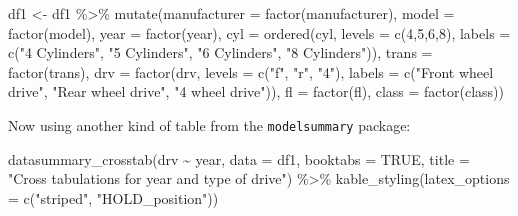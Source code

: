\documentclass[
  11pt,
  a4paper,
  twoside]{scrbook}
\newenvironment{Shaded}{\begin{snugshade}}{\end{snugshade}}
\newcommand{\AttributeTok}[1]{\textcolor[rgb]{0.77,0.63,0.00}{#1}}
\newcommand{\ConstantTok}[1]{\textcolor[rgb]{0.00,0.00,0.00}{#1}}
\newcommand{\DecValTok}[1]{\textcolor[rgb]{0.00,0.00,0.81}{#1}}
\newcommand{\FunctionTok}[1]{\textcolor[rgb]{0.00,0.00,0.00}{#1}}
\newcommand{\NormalTok}[1]{#1}
\newcommand{\OtherTok}[1]{\textcolor[rgb]{0.56,0.35,0.01}{#1}}
\newcommand{\SpecialCharTok}[1]{\textcolor[rgb]{0.00,0.00,0.00}{#1}}
\newcommand{\StringTok}[1]{\textcolor[rgb]{0.31,0.60,0.02}{#1}}
\begin{document}
\begin{Shaded}
\begin{Highlighting}[]
\NormalTok{df1 }\OtherTok{\textless{}{-}}\NormalTok{ df1 }\SpecialCharTok{\%\textgreater{}\%} 
    \FunctionTok{mutate}\NormalTok{(}\AttributeTok{manufacturer =} \FunctionTok{factor}\NormalTok{(manufacturer),}
           \AttributeTok{model =} \FunctionTok{factor}\NormalTok{(model),}
           \AttributeTok{year =} \FunctionTok{factor}\NormalTok{(year),}
           \AttributeTok{cyl =} \FunctionTok{ordered}\NormalTok{(cyl, }
                         \AttributeTok{levels =} \FunctionTok{c}\NormalTok{(}\DecValTok{4}\NormalTok{,}\DecValTok{5}\NormalTok{,}\DecValTok{6}\NormalTok{,}\DecValTok{8}\NormalTok{),}
                         \AttributeTok{labels =} \FunctionTok{c}\NormalTok{(}\StringTok{"4 Cylinders"}\NormalTok{,}
                                    \StringTok{"5 Cylinders"}\NormalTok{,}
                                    \StringTok{"6 Cylinders"}\NormalTok{,}
                                    \StringTok{"8 Cylinders"}\NormalTok{)),}
           \AttributeTok{trans =} \FunctionTok{factor}\NormalTok{(trans),}
           \AttributeTok{drv =} \FunctionTok{factor}\NormalTok{(drv, }
                        \AttributeTok{levels =} \FunctionTok{c}\NormalTok{(}\StringTok{"f"}\NormalTok{, }\StringTok{"r"}\NormalTok{, }\StringTok{"4"}\NormalTok{),}
                        \AttributeTok{labels =} \FunctionTok{c}\NormalTok{(}\StringTok{"Front wheel drive"}\NormalTok{,}
                                   \StringTok{"Rear wheel drive"}\NormalTok{,}
                                   \StringTok{"4 wheel drive"}\NormalTok{)),}
           \AttributeTok{fl =} \FunctionTok{factor}\NormalTok{(fl),}
           \AttributeTok{class =} \FunctionTok{factor}\NormalTok{(class)) }
\end{Highlighting}
\end{Shaded}

\linespread{1}

Now using another kind of table from the \texttt{modelsummary} package:

\linespread{1}

\begin{Shaded}
\begin{Highlighting}[]
\FunctionTok{datasummary\_crosstab}\NormalTok{(drv }\SpecialCharTok{\textasciitilde{}}\NormalTok{ year, }
                     \AttributeTok{data =}\NormalTok{ df1, }\AttributeTok{booktabs =} \ConstantTok{TRUE}\NormalTok{,}
        \AttributeTok{title =} \StringTok{"Cross tabulations for year and type of drive"}\NormalTok{) }\SpecialCharTok{\%\textgreater{}\%} 
    \FunctionTok{kable\_styling}\NormalTok{(}\AttributeTok{latex\_options =} \FunctionTok{c}\NormalTok{(}\StringTok{"striped"}\NormalTok{, }\StringTok{"HOLD\_position"}\NormalTok{))}
\end{Highlighting}
\end{Shaded}
\end{document}
